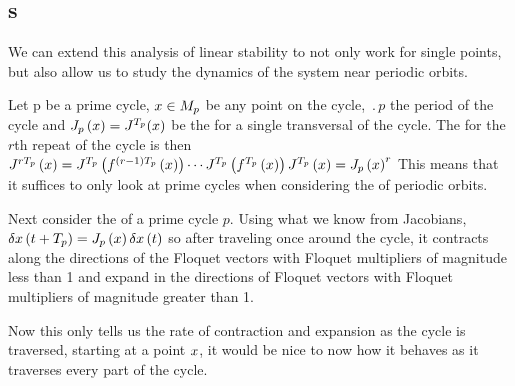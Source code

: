 \subsection{\Po s}{
\label{sect:SFpos}

We can extend this analysis of linear stability to not only
work for single points, but also allow us to study the
dynamics of the system near periodic orbits.

Let p be a prime cycle, $x \in M_p$ be any point on the
cycle, $\period{p}$ the period of the cycle and
$J_p\left(x\right) = J^{{T_{p}}}(x)$ be
the {\jacobianM} for a single transversal of the cycle.
The {\jacobianM} for the $r$th repeat of the cycle is then
$J^{r
{T_{p}}}\left(x\right)=J^{{T_{p}}}\left(f^{\left(r-1\right)
{T_{p}}}\left(x\right)\right) \cdots
J^{{T_{p}}}\left(f^{{T_{p}}}\left(x\right)\right)J^{{T_{p}}}\left(x\right)
=J_p\left(x\right)^r$
This means that it suffices to only look at prime cycles when
considering the {\jacobianMs} of periodic orbits.

Next consider the {\jacobianM} of a prime cycle $p$.
Using what we know from Jacobians,
$\delta x \left(t+{T_{p}}\right)
=J_p\left(x\right)\delta x\left(t\right)$
so after traveling once around the cycle, it contracts along
the directions of the Floquet vectors with Floquet
multipliers of magnitude less than 1 and expand in the
directions of Floquet vectors with Floquet multipliers of
magnitude greater than 1.

Now this only tells us the rate of contraction and expansion
as the cycle is traversed, starting at a point $x$, it
would be nice to now how it behaves as it traverses every
part of the cycle.

}
